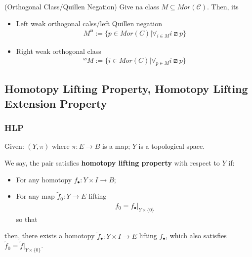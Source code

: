 \documentclass[Total.tex]{subfiles}
\begin{document}
			\begin{Def}
				(Orthogonal Class/Quillen Negation) Give na class $M\subseteq Mor(\mathcal{C})$. Then, its
				\begin{itemize}
					\item Left weak orthogonal calss/left Quillen negation 
					\begin{gather*}
						M^\boxslash:=\{p\in Mor(C)|\forall_{i\in M} i\boxslash p\}
					\end{gather*}
					\item Right weak orthogonal class
					\begin{gather*}
						{ }^\boxslash M:=\{i\in Mor(C)|\forall_{p\in M} i\boxslash p\}
					\end{gather*}
				\end{itemize}
			\end{Def}
			\subsection{Homotopy Lifting Property, Homotopy Lifting Extension Property}
				\subsubsection{HLP}
				\begin{Def}
					Given: $(Y,\pi)$ where $\pi:E\rightarrow B$ is a map; $Y$ is a topological space. 
					
					We say, the pair satisfies \textbf{homotopy lifting property} with respect to $Y$ if:
					\begin{itemize}
						\item For any homotopy $f_\bullet:Y\times I\rightarrow B$;
						\item For any map $\tilde{f}_0:Y\rightarrow E$ lifting
						\begin{gather*}
							f_0=f_\bullet|_{Y\times  \{0\}}
						\end{gather*}
						so that 
					\end{itemize}
					
					then, there exists a homotopy $\tilde{f}_\bullet:Y\times I\rightarrow E$ lifting $f_\bullet$, which also satisfies $\tilde{f}_0=\tilde{f}|_{Y\times \{0\}}$.
					
					\begin{center}
					\end{center}
				\end{Def}
\end{document}
